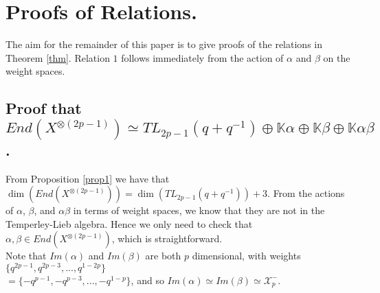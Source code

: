 \documentclass[]{article}
\begin{document}
\section{Proofs of Relations.}
The aim for the remainder of this paper is to give proofs of the relations in Theorem \ref{thm}. Relation $1$ follows immediately from the action of $\alpha$ and $\beta$ on the weight spaces.
\subsection{Proof that $End(X^{\otimes(2p-1)})\simeq TL_{2p-1}(q+q^{-1})\oplus\mathbb{K}\alpha\oplus\mathbb{K}\beta\oplus\mathbb{K}\alpha\beta$.\label{subsect 2}}
From Proposition \ref{prop1} we have that $\dim\left( End(X^{\otimes(2p-1)})\right)=\dim\left( TL_{2p-1}(q+q^{-1})\right) +3$. From the actions of $\alpha$, $\beta$, and $\alpha\beta$ in terms of weight spaces, we know that they are not in the Temperley-Lieb algebra. Hence we only need to check that $\alpha,\beta\in End(X^{\otimes(2p-1)})$, which is straightforward.\\

Note that $Im(\alpha)$ and $Im(\beta)$ are both $p$ dimensional, with weights $\{q^{2p-1},q^{2p-3},...,q^{1-2p}\}$\\ $=\{-q^{p-1},-q^{p-3},...,-q^{1-p}\}$, and so $Im(\alpha)\simeq Im(\beta)\simeq\mathcal{X}^{-}_{p}$.
\end{document}
